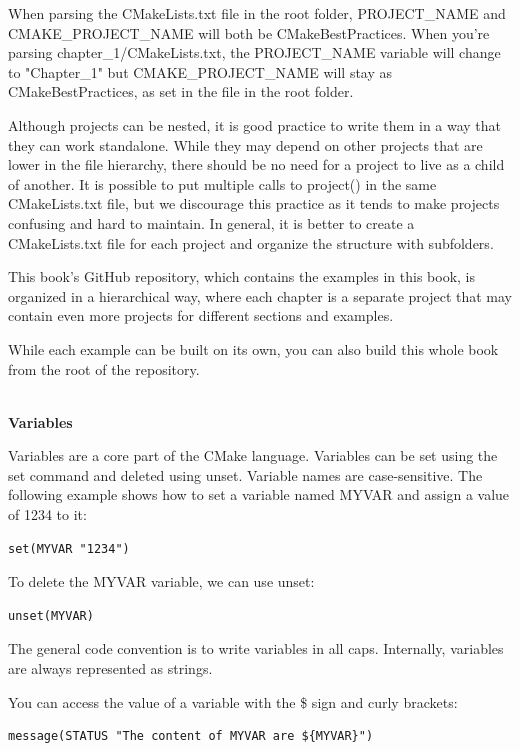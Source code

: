 When parsing the CMakeLists.txt file in the root folder, PROJECT\_NAME and CMAKE\_PROJECT\_NAME will both be CMakeBestPractices. When you're parsing chapter\_1/CMakeLists.txt, the PROJECT\_NAME variable will change to "Chapter\_1" but CMAKE\_PROJECT\_NAME will stay as CMakeBestPractices, as set in the file in the root folder.

Although projects can be nested, it is good practice to write them in a way that they can work standalone. While they may depend on other projects that are lower in the file hierarchy, there should be no need for a project to live as a child of another. It is possible to put multiple calls to project() in the same CMakeLists.txt file, but we discourage this practice as it tends to make projects confusing and hard to maintain. In general, it is better to create a CMakeLists.txt file for each project and organize the structure with subfolders.

This book's GitHub repository, which contains the examples in this book, is organized in a hierarchical way, where each chapter is a separate project that may contain even more projects for different sections and examples.

While each example can be built on its own, you can also build this whole book from the root of the repository.

\hspace*{\fill} \\ %
\noindent
\textbf{Variables}

Variables are a core part of the CMake language. Variables can be set using the set command and deleted using unset. Variable names are case-sensitive. The following example shows how to set a variable named MYVAR and assign a value of 1234 to it:

\begin{lstlisting}[style=styleCMake]
set(MYVAR "1234")
\end{lstlisting}

To delete the MYVAR variable, we can use unset:

\begin{lstlisting}[style=styleCMake]
unset(MYVAR)
\end{lstlisting}

The general code convention is to write variables in all caps. Internally, variables are always represented as strings.

You can access the value of a variable with the \$ sign and curly brackets:

\begin{lstlisting}[style=styleCMake]
message(STATUS "The content of MYVAR are ${MYVAR}")
\end{lstlisting}


